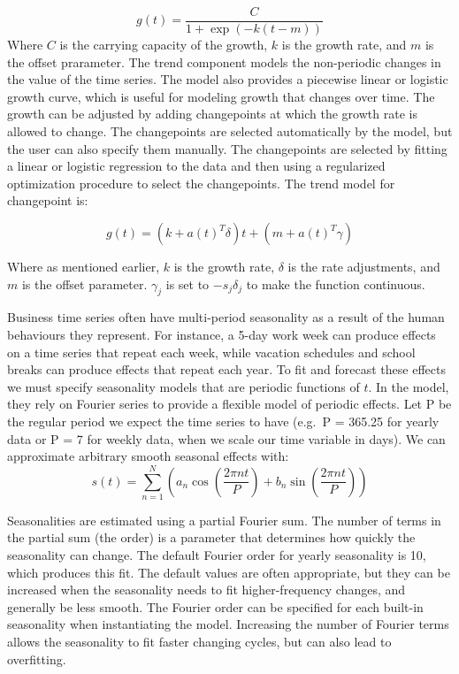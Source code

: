 \documentclass[mstat,12pt]{unswthesis}
\begin{document}
\[
g(t) = \frac{C}{1 + \exp(-k(t - m))}
\] Where \(C\) is the carrying capacity of the growth, \(k\) is the
growth rate, and \(m\) is the offset prarameter. The trend component
models the non-periodic changes in the value of the time series. The
model also provides a piecewise linear or logistic growth curve, which
is useful for modeling growth that changes over time. The growth can be
adjusted by adding changepoints at which the growth rate is allowed to
change. The changepoints are selected automatically by the model, but
the user can also specify them manually. The changepoints are selected
by fitting a linear or logistic regression to the data and then using a
regularized optimization procedure to select the changepoints. The trend
model for changepoint is:

\[
g(t) = (k+a(t)^T\delta) t + (m+a(t)^T\gamma)
\]

Where as mentioned earlier, \(k\) is the growth rate, \(\delta\) is the
rate adjustments, and \(m\) is the offset parameter. \(\gamma_j\) is set
to \(-s_j\delta_j\) to make the function continuous.

Business time series often have multi-period seasonality as a result of
the human behaviours they represent. For instance, a 5-day work week can
produce effects on a time series that repeat each week, while vacation
schedules and school breaks can produce effects that repeat each year.
To fit and forecast these effects we must specify seasonality models
that are periodic functions of \(t\). In the model, they rely on Fourier
series to provide a flexible model of periodic effects. Let P be the
regular period we expect the time series to have (e.g.~P = 365.25 for
yearly data or P = 7 for weekly data, when we scale our time variable in
days). We can approximate arbitrary smooth seasonal effects with: \[
s(t) = \sum_{n=1}^{N} (a_n \cos(\frac{2\pi nt}{P}) + b_n \sin(\frac{2\pi nt}{P}))
\]

Seasonalities are estimated using a partial Fourier sum. The number of
terms in the partial sum (the order) is a parameter that determines how
quickly the seasonality can change. The default Fourier order for yearly
seasonality is 10, which produces this fit. The default values are often
appropriate, but they can be increased when the seasonality needs to fit
higher-frequency changes, and generally be less smooth. The Fourier
order can be specified for each built-in seasonality when instantiating
the model. Increasing the number of Fourier terms allows the seasonality
to fit faster changing cycles, but can also lead to overfitting.
\end{document}
